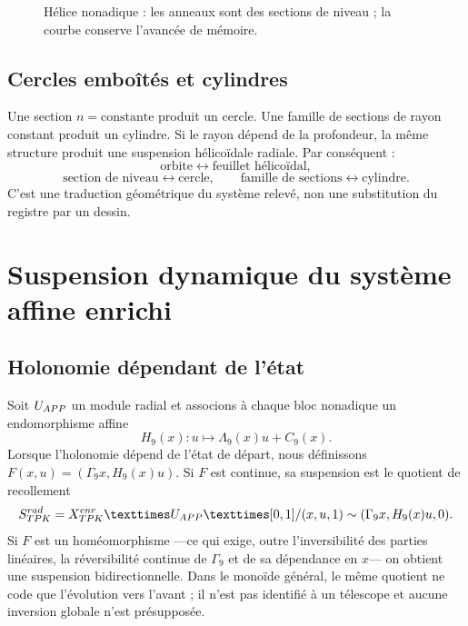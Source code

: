 \begin{figure}[htbp]
\centering
{}
\caption{Hélice nonadique : les anneaux sont des sections de niveau ; la courbe conserve l'avancée de mémoire.}
\label{espiral:fig:helice-nonadica-analitica}
\end{figure}

\section{Cercles emboîtés et cylindres}

Une section \(n=\text{constante}\) produit un cercle. Une famille de sections de rayon constant produit un cylindre. Si le rayon dépend de la profondeur, la même structure produit une suspension hélicoïdale radiale. Par conséquent :
\[
 \text{orbite}\longleftrightarrow\text{feuillet hélicoïdal},
\]
\[
 \text{section de niveau}\longleftrightarrow\text{cercle},
\qquad
 \text{famille de sections}\longleftrightarrow\text{cylindre}.
\]
C'est une traduction géométrique du système relevé, non une substitution du registre par un dessin.

\chapter{Suspension dynamique du système affine enrichi}

\section{Holonomie dépendant de l'état}

Soit \(U_{APP}\) un module radial et associons à chaque bloc nonadique un endomorphisme affine
\[
 H_9(x):u\longmapsto\Lambda_9(x)u+C_9(x).
\]
Lorsque l'holonomie dépend de l'état de départ, nous définissons \(F(x,u)=(\Gamma_9x,H_9(x)u)\). Si \(F\) est continue, sa suspension est le quotient de recollement
\begin{equation}
 \mathfrak S_{\TPK}^{\rad}
 =\frac{X_{\TPK}^{\enr}\times U_{\APP}\times[0,1]}
 {(x,u,1)\sim(\Gamma_9x,H_9(x)u,0)}.
 \label{espiral:eq:suspension-skew}
\end{equation}
Si \(F\) est un homéomorphisme ---ce qui exige, outre l'inversibilité des parties linéaires, la réversibilité continue de \(\Gamma_9\) et de sa dépendance en \(x\)--- on obtient une suspension bidirectionnelle. Dans le monoïde général, le même quotient ne code que l'évolution vers l'avant ; il n'est pas identifié à un télescope et aucune inversion globale n'est présupposée.


